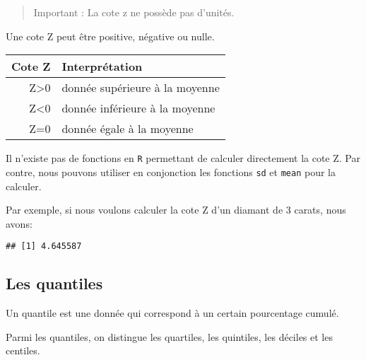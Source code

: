 \documentclass[]{book}
\newenvironment{Shaded}{\begin{snugshade}}{\end{snugshade}}
\newcommand{\KeywordTok}[1]{\textcolor[rgb]{0.13,0.29,0.53}{\textbf{#1}}}
\newcommand{\DecValTok}[1]{\textcolor[rgb]{0.00,0.00,0.81}{#1}}
\newcommand{\OperatorTok}[1]{\textcolor[rgb]{0.81,0.36,0.00}{\textbf{#1}}}
\newcommand{\NormalTok}[1]{#1}
\begin{document}
\begin{quote}
Important : La cote z ne possède pas d'unités.
\end{quote}

Une cote Z peut être positive, négative ou nulle.

\begin{longtable}[]{@{}rl@{}}
\toprule
Cote Z & Interprétation\tabularnewline
\midrule
\endhead
Z\textgreater{}0 & donnée supérieure à la moyenne\tabularnewline
Z\textless{}0 & donnée inférieure à la moyenne\tabularnewline
Z=0 & donnée égale à la moyenne\tabularnewline
\bottomrule
\end{longtable}

Il n'existe pas de fonctions en \texttt{R} permettant de calculer
directement la cote Z. Par contre, nous pouvons utiliser en conjonction
les fonctions \texttt{sd} et \texttt{mean} pour la calculer.

Par exemple, si nous voulons calculer la cote Z d'un diamant de 3
carats, nous avons:

\begin{Shaded}
\end{Shaded}

\begin{verbatim}
## [1] 4.645587
\end{verbatim}

\subsection{Les quantiles}\label{les-quantiles}

Un quantile est une donnée qui correspond à un certain pourcentage
cumulé.

Parmi les quantiles, on distingue les quartiles, les quintiles, les
déciles et les centiles.
\end{document}
